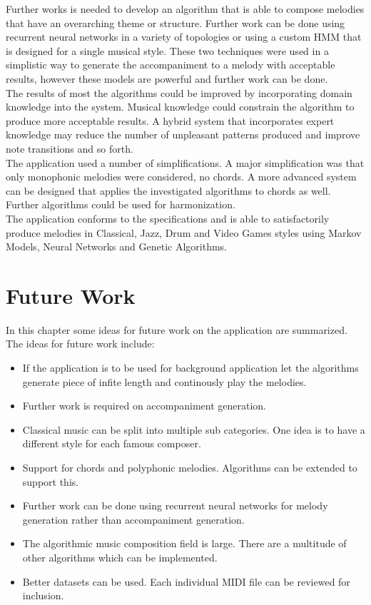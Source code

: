 Further works is needed to develop an algorithm that is able to compose melodies that have an overarching theme or structure.  Further work can be done using recurrent neural networks in a variety of topologies or using a custom \ac{HMM} that is designed for a single musical style. 
These two techniques were used in a simplistic way to generate the accompaniment to a melody with acceptable results, however these models are powerful and further work can be done.
\\

The results of most the algorithms could be improved by incorporating domain knowledge into the system. Musical knowledge could constrain the algorithm to produce more acceptable results. A hybrid system that incorporates expert knowledge may reduce the number of unpleasant patterns produced and improve note transitions and so forth.
\\

The application used a number of simplifications. A major simplification was that only monophonic melodies were considered, no chords. A more advanced system can be designed that applies the investigated algorithms to chords as well. Further algorithms could be used for harmonization.
\\

The application conforms to the specifications and is able to satisfactorily produce melodies in Classical, Jazz, Drum and Video Games styles using Markov Models, Neural Networks and Genetic Algorithms.

\chapter{Future Work}

In this chapter some ideas for future work on the application are summarized.
The ideas for future work include:

\begin{itemize}
\item If the application is to be used for background application let the algorithms generate piece of infite length and continously play the melodies.
\item Further work is required on accompaniment generation.
\item Classical music can be split into multiple sub categories. One idea is to have a different style for each famous composer.
\item Support for chords and polyphonic melodies. Algorithms can be extended to support this.
\item Further work can be done using recurrent neural networks for melody generation rather than accompaniment generation.
\item The algorithmic music composition field is large. There are a multitude of other algorithms which can be implemented.
\item Better datasets can be used. Each individual \ac{MIDI} file can be reviewed for inclusion.
\end{itemize}